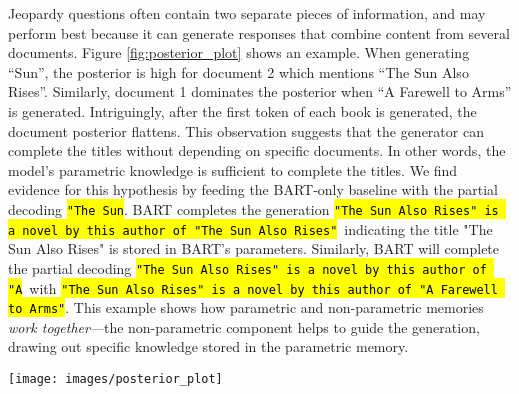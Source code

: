 \documentclass{article}
\begin{document}
Jeopardy questions often contain two separate pieces of information, and \ragtoken{} may perform best because it can generate responses that combine content from several documents.
Figure \ref{fig:posterior_plot} shows an example. When generating ``Sun'', the posterior is high for document 2 which mentions ``The Sun Also Rises''.
Similarly, document 1 dominates the posterior when ``A Farewell to Arms'' is generated.
Intriguingly, after the first token of each book is generated, the document posterior flattens. This observation suggests that the generator can complete the titles without depending on specific documents. In other words, the model's parametric knowledge is sufficient to complete the titles.
We find evidence for this hypothesis by feeding the BART-only baseline with the partial decoding \footnotesize\hl{\texttt{"The Sun}}\normalsize.
BART completes the generation 
\footnotesize\hl{\texttt{"The Sun Also Rises" is a novel by this author of "The Sun Also Rises"}}\normalsize \ 
indicating the title "The Sun Also Rises" is stored in BART's parameters. Similarly, BART will complete the partial decoding \footnotesize\hl{\texttt{"The Sun Also Rises" is a novel by this author of "A}}\normalsize\ with \footnotesize\hl{\texttt{"The Sun Also Rises" is a novel by this author of "A Farewell to Arms"}}\normalsize. This example shows how parametric and non-parametric memories \emph{work together}---the non-parametric component helps to guide the generation, drawing out specific knowledge stored in the parametric memory.


\begin{figure*}
\centering

  \texttt{[image: images/posterior\_plot]}
  \vspace{-15pt}
\caption{\ragtoken{} document posterior  for each generated token for input ``Hemingway" for Jeopardy generation with 5 retrieved documents. The posterior for document 1 is high when generating ``A Farewell to Arms" and for document 2 when generating ``The Sun Also Rises". }
  \label{fig:posterior_plot}
\end{figure*}
\end{document}
